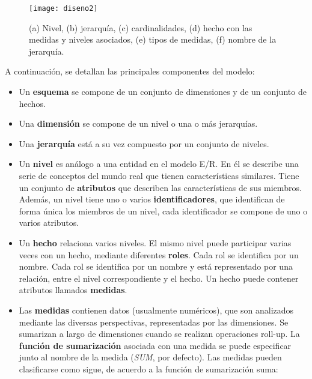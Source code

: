 \documentclass[a4paper,11pt]{article}
\begin{document}
      \begin{figure}[h]
        \begin{center}
          \texttt{[image: diseno2]}
          \caption{(a) Nivel, (b) jerarquía, (c) cardinalidades, (d) hecho con las medidas y niveles asociados, (e) tipos de medidas, (f) nombre de la jerarquía.}
          \label{disenoNotaciones}
        \end{center}
      \end{figure}
      
      A continuación, se detallan las principales componentes del modelo:
      
      \begin{itemize}
        \item Un \textbf{esquema} se compone de un conjunto de dimensiones y de un conjunto de hechos.
        \item Una \textbf{dimensión} se compone de un nivel o una o más jerarquías.
        \item Una \textbf{jerarquía} está a su vez compuesto por un conjunto de niveles. 
        \item Un \textbf{nivel} es análogo a una entidad en el modelo E/R. En él se describe una serie de conceptos del mundo real que tienen
        características similares. Tiene un conjunto de \textbf{atributos} que describen las características de sus miembros. Además, un nivel tiene uno o
        varios \textbf{identificadores}, que identifican de forma única los miembros de un nivel, cada identificador se compone de uno o varios atributos.
        \item Un \textbf{hecho} relaciona varios niveles. El mismo nivel puede participar varias veces con un hecho, mediante diferentes \textbf{roles}.
        Cada rol se identifica por un nombre. Cada rol se identifica por un nombre y está representado por una relación, entre el nivel correspondiente y el hecho.
        Un hecho puede contener atributos llamados \textbf{medidas}.
        \item Las \textbf{medidas} contienen datos (usualmente numéricos), que son analizados mediante las diversas perspectivas, representadas por las dimensiones.
        Se sumarizan a largo de dimensiones cuando se realizan operaciones roll-up. La \textbf{función de sumarización} asociada
        con una medida se puede especificar junto al nombre de la medida (\textit{SUM}, por defecto). Las medidas pueden clasificarse como sigue,
        de acuerdo a la función de sumarización suma:
        \begin{itemize}

\end{itemize}
\end{itemize}
\end{document}
